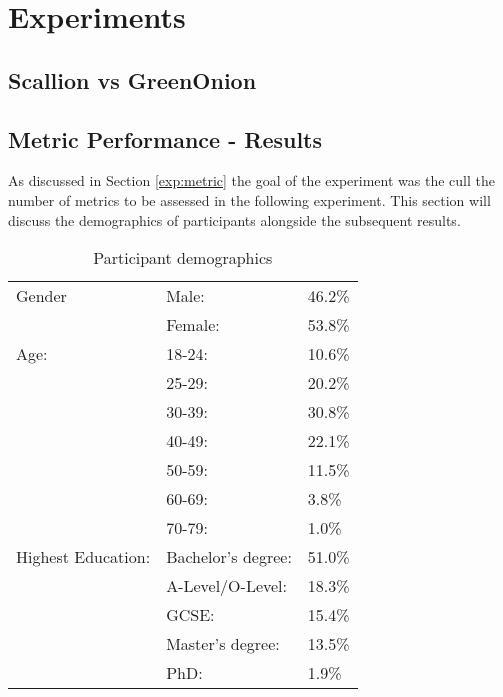 \chapter{Experiments}
\label{cha:Experiments}

\section{Scallion vs GreenOnion}

\section{Metric Performance - Results}
As discussed in Section \ref{exp:metric} the goal of the experiment was the cull the number of metrics to be assessed in the following experiment. This section will discuss the demographics of participants alongside the subsequent results.

\begin{table}[h!]
    \centering
    \begin{tabular}{|l|ll|}
        \hline
        Gender & Male: & 46.2\% \\
               & Female: & 53.8\% \\
        \hline
        Age:   & 18-24: & 10.6\% \\ 
               & 25-29: & 20.2\% \\ 
               & 30-39: & 30.8\% \\ 
               & 40-49: & 22.1\% \\ 
               & 50-59: & 11.5\% \\ 
               & 60-69: & 3.8\% \\ 
               & 70-79: & 1.0\% \\ 
               
        \hline
        Highest Education:  & Bachelor's degree:    & 51.0\% \\
                            & A-Level/O-Level:      & 18.3\% \\
                            & GCSE:                 & 15.4\%  \\
                            & Master's degree:      & 13.5\% \\ 
                            & PhD:                  & 1.9\% \\
        \hline

    \end{tabular}
    \caption{Participant demographics}
    \label{tab:exp1_demo}
\end{table}

